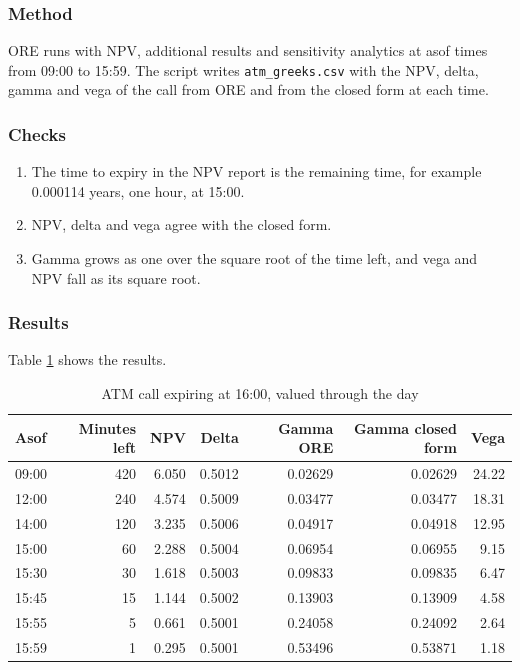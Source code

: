 \documentclass[12pt, a4paper]{article}
\begin{document}
\subsubsection*{Method}

ORE runs with NPV, additional results and sensitivity analytics at asof times from 09:00 to 15:59. The script writes
\texttt{atm\_greeks.csv} with the NPV, delta, gamma and vega of the call from ORE and from the closed form at each
time.

\subsubsection*{Checks}

\begin{enumerate}
\item The time to expiry in the NPV report is the remaining time, for example 0.000114 years, one hour, at 15:00.
\item NPV, delta and vega agree with the closed form.
\item Gamma grows as one over the square root of the time left, and vega and NPV fall as its square root.
\end{enumerate}

\subsubsection*{Results}

Table \ref{tab:atmevolution} shows the results.

\begin{table}[hbt]
\centering
\begin{tabular}{|l|r|r|r|r|r|r|}
\hline
Asof & Minutes left & NPV & Delta & Gamma ORE & Gamma closed form & Vega \\
\hline
09:00 & 420 & 6.050 & 0.5012 & 0.02629 & 0.02629 & 24.22 \\
12:00 & 240 & 4.574 & 0.5009 & 0.03477 & 0.03477 & 18.31 \\
14:00 & 120 & 3.235 & 0.5006 & 0.04917 & 0.04918 & 12.95 \\
15:00 & 60 & 2.288 & 0.5004 & 0.06954 & 0.06955 & 9.15 \\
15:30 & 30 & 1.618 & 0.5003 & 0.09833 & 0.09835 & 6.47 \\
15:45 & 15 & 1.144 & 0.5002 & 0.13903 & 0.13909 & 4.58 \\
15:55 & 5 & 0.661 & 0.5001 & 0.24058 & 0.24092 & 2.64 \\
15:59 & 1 & 0.295 & 0.5001 & 0.53496 & 0.53871 & 1.18 \\
\hline
\end{tabular}
\caption{ATM call expiring at 16:00, valued through the day}
\label{tab:atmevolution}
\end{table}
\end{document}
